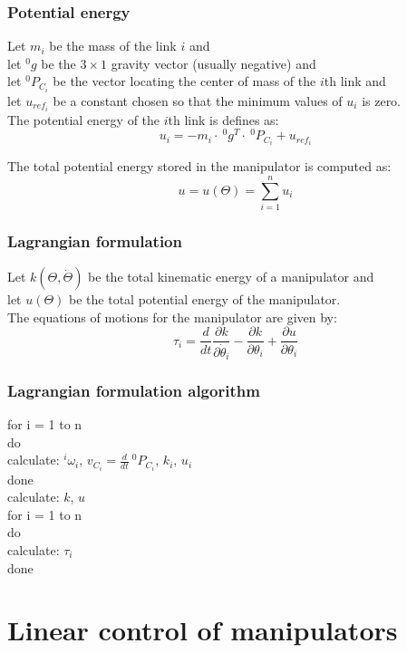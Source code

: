 \documentclass[10pt,a4paper]{article}
\newcommand{\tab}[1][1]{\hspace*{#1cm}}
\begin{document}
\subsubsection{Potential energy}
Let $m_i$ be the mass of the link $i$ and \\
let $^0g$ be the $3 \times 1$ gravity vector (usually negative) and \\
let $^0P_{C_i}$ be the vector locating the center of mass of the $i$th link and \\
let $u_{ref_i}$ be a constant chosen so that the minimum values of $u_i$ is zero. \\
The potential energy of the $i$th link is defines as:
$$
u_i = -m_i ⋅ ~^0g^T ⋅ ~^0P_{C_i} + u_{ref_i}
$$

The total potential energy stored in the manipulator is computed as:
$$
u = u(\Theta) = \sum_{i = 1}^n u_i
$$

\subsubsection{Lagrangian formulation}
Let $k(\Theta, \dot \Theta)$ be the total kinematic energy of a manipulator and \\
let $u(\Theta)$ be the total potential energy of the manipulator. \\
The equations of motions for the manipulator are given by:
$$
\tau_i = \frac d {dt} \frac {\partial k}{\partial \dot \theta_i} - \frac {\partial k}{\partial \theta_i} + \frac {\partial u}{\partial \theta_i}
$$

\subsubsection{Lagrangian formulation algorithm}
for i = 1 to n \\
do \\
\tab	calculate: $^i\omega_i$, $v_{C_i} = \frac{d}{d t} ~^0P_{C_i}$, $k_i$, $u_i$ \\
done \\
calculate: $k$, $u$ \\
for i = 1 to n \\
do \\
\tab	calculate: $\tau_i$ \\
done \\

\section{Linear control of manipulators}
\end{document}
